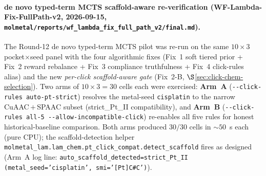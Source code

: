 \paragraph{de novo typed-term MCTS scaffold-aware re-verification
(WF-Lambda-Fix-FullPath-v2, 2026-09-15,
\texttt{molmetal/reports/wf\_lambda\_fix\_full\_path\_v2/final.md}).}
The Round-12 de novo typed-term MCTS pilot was re-run on the same
$10 \times 3$ pocket$\times$seed panel with the four
algorithmic fixes (Fix~1 soft tiered prior + Fix~2 reward rebalance
+ Fix~3 compliance truthfulness + Fix~4 click-rules alias) and the
new \emph{per-click scaffold-aware gate} (Fix~2-B,
$\S$\ref{sec:click-chem-selection}). Two arms of $10 \times 3 = 30$
cells each were exercised: \textbf{Arm~A}
(\texttt{-{}-click-rules auto-pt-strict}) resolves the metal-seed
\texttt{cisplatin} to the narrow CuAAC\,$+$\,SPAAC subset
(strict\_Pt\_II compatibility), and \textbf{Arm~B}
(\texttt{-{}-click-rules all-5 -{}-allow-incompatible-click}) re-enables
all five rules for honest historical-baseline comparison. Both
arms produced $30/30$ cells in $\sim 50$~s each (pure CPU); the
scaffold-detection helper
\texttt{molmetal\_lam.lam\_chem.pt\_click\_compat.detect\_scaffold}
fires as designed (Arm~A log line:
\texttt{auto\_scaffold\_detected=strict\_Pt\_II (metal\_seed='cisplatin',
smi='[Pt]C\#C')}).

